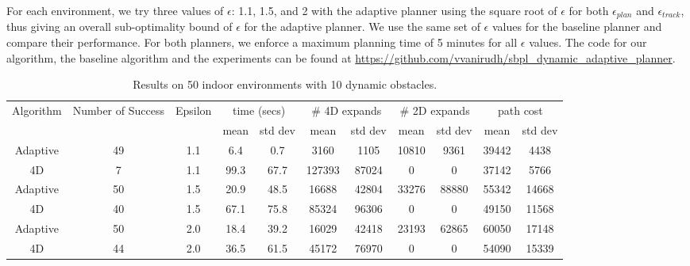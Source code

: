 For each environment, we try three values of $\epsilon$: 1.1, 1.5, and 2 with the adaptive planner using the square root of $\epsilon$ for both $\epsilon_{plan}$ and $\epsilon_{track}$, thus giving an overall sub-optimality bound of $\epsilon$ for the adaptive planner. We use the same set of $\epsilon$ values for the baseline planner and compare their performance. For both planners, we enforce a maximum planning time of 5 minutes for all $\epsilon$ values. 
The code for our algorithm, the baseline algorithm and the experiments can be found at \url{https://github.com/vvanirudh/sbpl_dynamic_adaptive_planner}.

\begin{table}[t]
\scriptsize
\centering

\begin{tabular}{|c|c|c|c c|c c|c c|c c|}
\hline
Algorithm & Number of Success & Epsilon & \multicolumn{2}{|c|}{time (secs)} & \multicolumn{2}{|c|}{\# 4D expands} & \multicolumn{2}{|c|}{\# 2D expands} & \multicolumn{2}{|c|}{path cost} \\ 
 & & & mean & std dev & mean & std dev & mean & std dev & mean  & std dev \\ \hline\hline
Adaptive & 49 & 1.1 & 6.4 & 0.7 & 3160 & 1105 & 10810 & 9361 & 39442 & 4438 \\
\hline
4D & 7 & 1.1 & 99.3 & 67.7 & 127393 & 87024 & 0 & 0 & 37142 & 5766 \\
\hline\hline
Adaptive & 50 & 1.5 & 20.9 & 48.5 & 16688 & 42804 & 33276 & 88880 & 55342 & 14668 \\
\hline
4D & 40 & 1.5 & 67.1 & 75.8 & 85324 & 96306 & 0 & 0 & 49150 & 11568 \\
\hline\hline
Adaptive & 50 & 2.0 & 18.4 & 39.2 & 16029 & 42418 & 23193 & 62865 & 60050 & 17148 \\
\hline
4D & 44 & 2.0 & 36.5 & 61.5 & 45172 & 76970 & 0 & 0 & 54090 & 15339 \\
\hline
\end{tabular}

\caption{Results on 50 indoor environments with 10 dynamic obstacles.}
\label{tab:ppad-indoor-10}
\end{table}



